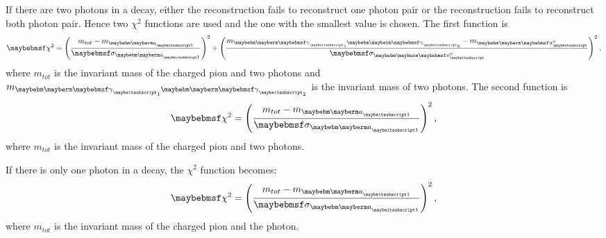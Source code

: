 If there are two photons in a decay, either the reconstruction fails to reconstruct one photon pair or the reconstruction fails to reconstruct both photon pair. Hence two $\chi^2$ functions are used and the one with the smallest value is chosen. The first function is
\begin{equation}
\chi^{2} = {\left(\frac{m_{tot} -  m_{\Pai}}{\sigma_{\Pai}}\right)}^{2} + {\left(\frac{m_{\Pphoton_1 \Pphoton_2} -  m_{\Ppizero}}{\sigma_{\Ppizero}}\right)}^{2}  \,,
\end{equation}
where $m_{tot}$ is the invariant mass of the charged pion and two photons and $m_{\Pphoton_1 \Pphoton_2}$ is the invariant mass of two photons. The second function is
\begin{equation}
\chi^{2} = {\left(\frac{m_{tot} -  m_{\Pai}}{\sigma_{\Pai}}\right)}^{2} \,,
\end{equation}
where $m_{tot}$ is the invariant mass of the charged pion and two photons.


If there is only one photon in a decay, the $\chi^{2}$ function becomes:
\begin{equation}
\chi^{2} = {\left(\frac{m_{tot} -  m_{\Pai}}{\sigma_{\Pai}}\right)}^{2} \,,
\end{equation}
where $m_{tot}$ is the invariant mass of the charged pion and the photon.






